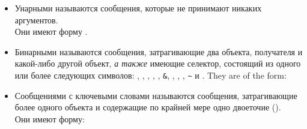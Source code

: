 \documentclass[a4paper,10pt,twoside]{book}
\begin{document}
{\begin{itemize}
\item Унарными называются сообщения, которые не принимают никаких аргументов.\\
Они имеют форму .

\item Бинарными называются сообщения, затрагивающие два объекта, получателя и какой-либо другой объект, \emph{а также} имеющие селектор, состоящий из одного или более следующих символов: \ct{+}, \ct{-}, \ct{*}, \ct{/}, \ct{|}, \texttt{\&}, \ct{=}, \ct{>}, \ct{<}, \texttt{\~} и .
They are of the form: 
\item Сообщениями с ключевыми словами называются сообщения, затрагивающие более одного объекта и содержащие по крайней мере одно двоеточие (\ct{:}). \\
Они имеют форму:


\end{itemize}}
\end{document}
